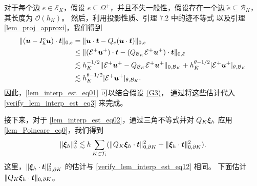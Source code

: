 对于每个边 $e\in\mathcal{E}_K$，假设 $e \subseteq \Omega^+$，并且不失一般性，假设存在一个边 $\tilde{e} \subseteq \mathcal{B}_K$，其长度为 $\mathcal{O}(h_K)$。
然后，利用投影性质、引理 7.2 中的迹不等式 \cite{2017ErnGuermond} 以及引理 \ref{lem_proj_approxi}，我们得到
\begin{equation}
\begin{split}
\label{verify_lem_interp_est_eq12}
\| ( \boldsymbol{u} - I^e_h \boldsymbol{u})\cdot\boldsymbol{t} \|_{0,e} & = \| \boldsymbol{u}\cdot\boldsymbol{t} - Q_e (\boldsymbol{u}\cdot\boldsymbol{t}) \|_{0,e} \\
& \le \| (\mathcal{E}^+\boldsymbol{u}^+)\cdot\boldsymbol{t} - (Q_{\mathcal{B}_K} \mathcal{E}^+\boldsymbol{u}^+)\cdot\boldsymbol{t} \|_{0,\tilde{e}} \\
& \lesssim h^{-1/2}_K \| \mathcal{E}^+\boldsymbol{u}^+ - Q_{\mathcal{B}_K} \mathcal{E}^+\boldsymbol{u}^+ \|_{0,\mathcal{B}_K}
+ h^{\theta-1/2}_K | \mathcal{E}^+\boldsymbol{u}^+ |_{\theta,\mathcal{B}_K} \\
& \lesssim h^{\theta-1/2}_K | \mathcal{E}^+\boldsymbol{u}^+ |_{\theta,\mathcal{B}_K}.
\end{split}
\end{equation}
因此，\eqref{lem_interp_est_eq01} 可以结合假设
\hyperref[asp:polygonG3]{(G3)}，
通过将这些估计代入 \eqref{verify_lem_interp_est_eq3} 来完成。

接下来，对于 \eqref{lem_interp_est_eq02}，通过三角不等式并对 $Q_K\boldsymbol{\xi}_h$ 应用 \eqref{lem_Poincare_eq0}，我们得到
\begin{equation}
\begin{split}
\label{verify_lem_interp_est_eq4}
\|  \bxi_h \|^2_{b} %
\lesssim h \sum_{K\in\mathcal{T}_i} ( \| Q_K \bxi_h\cdot\bt \|^2_{0,\partial K} + \| \bxi_h\cdot\bt \|^2_{0,\partial K} ).
\end{split}
\end{equation}
这里，$\| \boldsymbol{\xi}_h\cdot\boldsymbol{t} \|^2_{0,\partial K}$ 的估计与 \eqref{verify_lem_interp_est_eq12} 相同。
下面估计 $\| Q_K \boldsymbol{\xi}_h\cdot\boldsymbol{t} \|_{0,\partial K}$。

